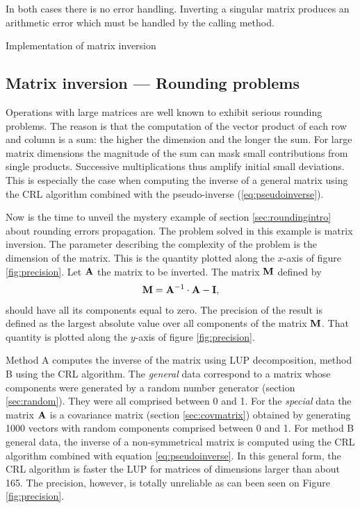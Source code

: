\documentclass[twoside]{book}
\begin{document}
In both cases there is no error handling. Inverting a singular
matrix produces an arithmetic error which must be handled by the
calling method.

\begin{listing}  Implementation of matrix inversion \label{ls:inversion}


\end{listing}


\subsection{Matrix inversion --- Rounding problems}
\label{sec:matrixrounding} Operations with large matrices are well
known to exhibit serious rounding problems. The reason is that the
computation of the vector product of each row and column is a sum:
the higher the dimension and the longer the sum. For large matrix
dimensions the magnitude of the sum can mask small contributions
from single products. Successive multiplications thus amplify
initial small deviations. This is especially the case when
computing the inverse of a general matrix using the CRL algorithm
combined with the pseudo-inverse (\ref{eq:pseudoinverse}).

Now is the time to unveil the mystery example of section
\ref{sec:roundingintro} about rounding errors propagation. The
problem solved in this example is matrix inversion. The parameter
describing the complexity of the problem is the dimension of the
matrix. This is the quantity plotted along the $x$-axis of figure
\ref{fig:precision}. Let ${\bf A}$ the matrix to be inverted. The
matrix ${\bf M}$ defined by
\begin{equation}
  {\bf M}={\bf A}^{-1}\cdot{\bf A}-{\bf I},
\end{equation}
should have all its components equal to zero. The precision of the
result is defined as the largest absolute value over all
components of the matrix ${\bf M}$. That quantity is plotted along
the $y$-axis of figure \ref{fig:precision}.

Method A computes the inverse of the matrix using LUP
decomposition, method B using the CRL algorithm. The {\sl general}
data correspond to a matrix whose components were generated by a
random number generator (\cf section \ref{sec:random}). They were
all comprised between 0 and 1. For the {\sl special} data the
matrix ${\bf A}$ is a covariance matrix (\cf section
\ref{sec:covmatrix}) obtained by generating 1000 vectors with
random components comprised between 0 and 1. For method B general
data, the inverse of a non-symmetrical matrix is computed using
the CRL algorithm combined with equation \ref{eq:pseudoinverse}.
In this general form, the CRL algorithm is faster the LUP for
matrices of dimensions larger than about 165. The precision,
however, is totally unreliable as can been seen on Figure
\ref{fig:precision}.
\end{document}
